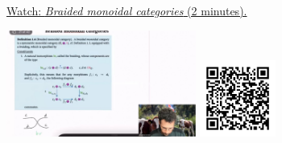 
\begin{minipage}{10cm}
    \href{https://act4e-spring21.netlify.app/videos/spring2021-par-feedback:braided-moncat.html}{Watch: \emph{Braided monoidal categories} (2 minutes).}
        
    \href{https://act4e-spring21.netlify.app/videos/spring2021-par-feedback:braided-moncat.html}{\includegraphics[height=3.5cm]{spring2021-par-feedback:braided-moncat/thumbnails.jpg}}
    \href{https://act4e-spring21.netlify.app/videos/spring2021-par-feedback:braided-moncat.html}{\includegraphics[height=2.5cm]{spring2021-par-feedback:braided-moncat/qrcode.png}}
\end{minipage}
